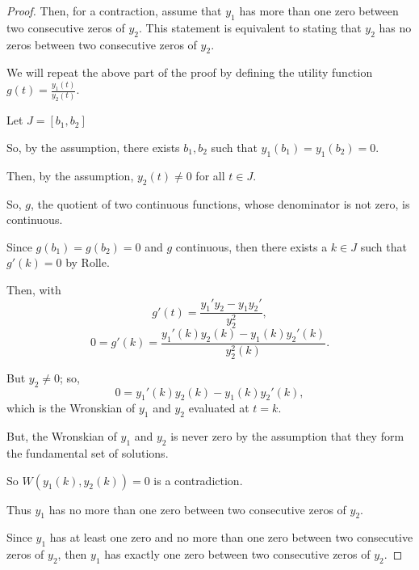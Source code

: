 \documentclass[../hw6]{subfiles}
\begin{document}
\begin{proof}
Then, for a contraction, assume that $y_1$ has more than one zero between two consecutive zeros of $y_2$. This statement is equivalent to stating that $y_2$ has no zeros between two consecutive zeros of $y_2$.

We will repeat the above part of the proof by defining the utility function $g(t)=\frac{y_1(t)}{y_2(t)}$.

Let $J=[b_1,b_2]$

So, by the assumption, there exists $b_1,b_2$ such that $y_1(b_1)=y_1(b_2)=0$.

Then, by the assumption, $y_2(t)\neq0$ for all $t\in J$.

So, $g$, the quotient of two continuous functions, whose denominator is not zero, is continuous.

Since $g(b_1)=g(b_2)=0$ and $g$ continuous, then there exists a $k\in J$ such that $g'(k)=0$ by Rolle.

Then, with
\[g'(t)=\frac{y_1'y_2-y_1y_2'}{y_2^2},\]
\[0=g'(k)=\frac{y_1'(k)y_2(k)-y_1(k)y_2'(k)}{y_2^2(k)}.\]

But $y_2\neq0$; so, \[0=y_1'(k)y_2(k)-y_1(k)y_2'(k),\] which is the Wronskian of $y_1$ and $y_2$ evaluated at $t=k$. 

But, the Wronskian of $y_1$ and $y_2$ is never zero by the assumption that they form the fundamental set of solutions.

So $W(y_1(k),y_2(k))=0$ is a contradiction. 

Thus $y_1$ has no more than one zero between two consecutive zeros of $y_2$.

Since $y_1$ has at least one zero and no more than one zero between two consecutive zeros of $y_2$, then $y_1$ has exactly one zero between two consecutive zeros of $y_2$. 

\end{proof}
\end{document}
